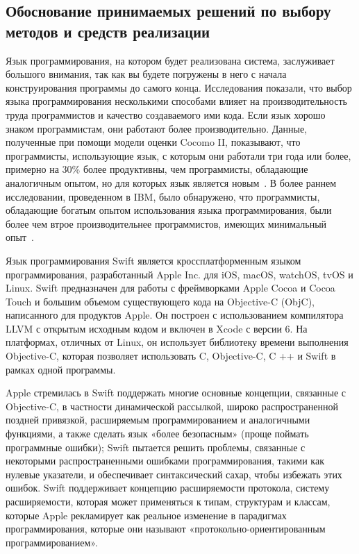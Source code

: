 \newpage
\subsection{Обоснование принимаемых решений по выбору методов и средств реализации}
\label{sec:develop:functionalModel}

Язык программирования, на котором будет реализована система, заслуживает большого внимания, так как вы будете погружены в него с начала конструирования программы до самого конца. Исследования показали, что выбор языка программирования несколькими способами влияет на производительность труда программистов и качество создаваемого ими кода. Если язык хорошо знаком программистам, они работают более производительно. Данные, полученные при помощи модели оценки Cocomo II, показывают, что программисты, использующие язык, с которым они работали три года или более, примерно на 30\% более продуктивны, чем программисты, обладающие аналогичным опытом, но для которых язык является новым~\cite{software_cost_estimation}. В более раннем исследовании, проведенном в IBM, было обнаружено, что программисты, обладающие богатым опытом использования языка программирования, были более чем втрое производительнее программистов, имеющих минимальный опыт~\cite{method_of_programming_measurement_and_estimation}.

Язык программирования Swift является кроссплатформенным языком программирования, разработанный Apple Inc. для iOS, macOS, watchOS, tvOS и Linux. Swift предназначен для работы с фреймворками Apple Cocoa и Cocoa Touch и большим объемом существующего кода на  Objective-C (ObjC), написанного для продуктов Apple. Он построен с использованием компилятора LLVM с открытым исходным кодом и включен в Xcode с версии 6. На платформах, отличных от Linux, он использует библиотеку времени выполнения Objective-C, которая позволяет использовать C, Objective-C, C ++ и Swift в рамках одной программы.

Apple стремилась в Swift поддержать многие основные концепции, связанные с Objective-C, в частности динамической рассылкой, широко распространенной поздней привязкой, расширяемым программированием и аналогичными функциями, а также сделать язык «более безопасным» (проще поймать программные ошибки); Swift пытается решить проблемы, связанные с некоторыми распространенными ошибками программирования, такими как нулевые указатели, и обеспечивает синтаксический сахар, чтобы избежать этих ошибок. Swift поддерживает концепцию расширяемости протокола, систему расширяемости, которая может применяться к типам, структурам и классам, которые Apple рекламирует как реальное изменение в парадигмах программирования, которые они называют «протокольно-ориентированным программированием».

